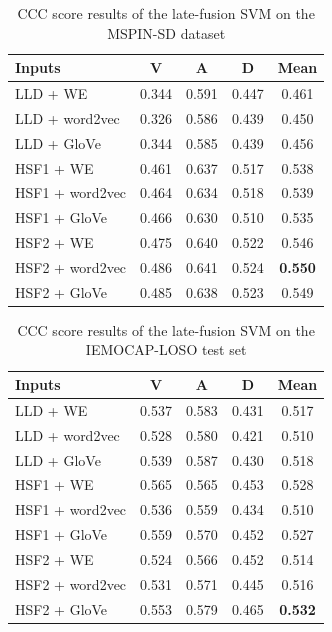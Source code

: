 \begin{table}
\caption{CCC score results of the late-fusion SVM on the MSPIN-SD dataset}    
\begin{center}
 \label{tab:svm-mspin-sd}
 \begin{tabular}{l c c c c}
 \hline
Inputs & V & A & D & Mean \\
\hline \hline
LLD     + WE        & 0.344 & 0.591 & 0.447 & 0.461 \\
LLD     + word2vec  & 0.326 & 0.586 & 0.439 & 0.450 \\
LLD     + GloVe     & 0.344 & 0.585 & 0.439 & 0.456 \\
HSF1    + WE        & 0.461 & 0.637 & 0.517 & 0.538 \\
HSF1    + word2vec  & 0.464 & 0.634 & 0.518 & 0.539 \\
HSF1    + GloVe     & 0.466 & 0.630 & 0.510 & 0.535 \\
HSF2    + WE        & 0.475 & 0.640 & 0.522 & 0.546 \\
HSF2    + word2vec  & 0.486 & 0.641 & 0.524 & \textbf{0.550} \\
HSF2    + GloVe     & 0.485 & 0.638 & 0.523 & 0.549 \\
 \hline
 \end{tabular}
\end{center}
\end{table} 

\begin{table}[!htpb]
\caption{CCC score results of the late-fusion SVM on the IEMOCAP-LOSO test set}
\begin{center}
 \label{tab:svm-iemocap-loso}
 \begin{tabular}{l c c c c}
 \hline 
Inputs & V & A & D & Mean \\
\hline \hline
LLD     + WE        & 0.537 & 0.583 & 0.431 & 0.517 \\
LLD     + word2vec  & 0.528 & 0.580 & 0.421 & 0.510 \\
LLD     + GloVe     & 0.539 & 0.587 & 0.430 & 0.518 \\
HSF1    + WE        & 0.565 & 0.565 & 0.453 & 0.528 \\
HSF1    + word2vec  & 0.536 & 0.559 & 0.434 & 0.510 \\
HSF1    + GloVe     & 0.559 & 0.570 & 0.452 & 0.527 \\
HSF2    + WE        & 0.524 & 0.566 & 0.452 & 0.514 \\
HSF2    + word2vec  & 0.531 & 0.571 & 0.445 & 0.516 \\
HSF2    + GloVe     & 0.553 & 0.579 & 0.465 & \textbf{0.532} \\
 \hline
\end{tabular}
\end{center}
\end{table} 


